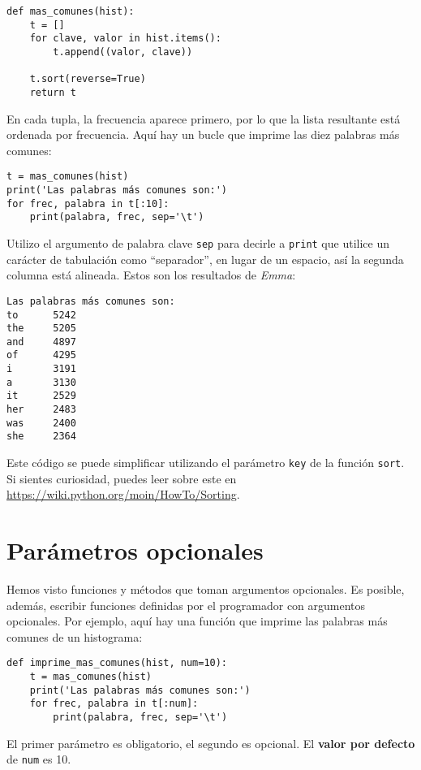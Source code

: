 \documentclass[10pt]{book}
\begin{document}
\begin{verbatim}
def mas_comunes(hist):
    t = []
    for clave, valor in hist.items():
        t.append((valor, clave))

    t.sort(reverse=True)
    return t
\end{verbatim}

En cada tupla, la frecuencia aparece primero, por lo que la lista resultante está
ordenada por frecuencia.  Aquí hay un bucle que imprime las diez palabras más
comunes:

\begin{verbatim}
t = mas_comunes(hist)
print('Las palabras más comunes son:')
for frec, palabra in t[:10]:
    print(palabra, frec, sep='\t')
\end{verbatim}
%
Utilizo el argumento de palabra clave {\tt sep} para decirle a {\tt print} que utilice un
carácter de tabulación como ``separador'', en lugar de un espacio, así la segunda
columna está alineada.  Estos son los resultados de {\em Emma}:

\begin{verbatim}
Las palabras más comunes son:
to      5242
the     5205
and     4897
of      4295
i       3191
a       3130
it      2529
her     2483
was     2400
she     2364
\end{verbatim}
%
Este código se puede simplificar utilizando el parámetro {\tt key} de
la función {\tt sort}.  Si sientes curiosidad, puedes leer sobre este
en \url{https://wiki.python.org/moin/HowTo/Sorting}.


\section{Parámetros opcionales}

Hemos visto funciones y métodos que toman argumentos
opcionales.  Es posible, además, escribir funciones definidas por el programador
con argumentos opcionales.  Por ejemplo, aquí hay una función que
imprime las palabras más comunes de un histograma:

\begin{verbatim}
def imprime_mas_comunes(hist, num=10):
    t = mas_comunes(hist)
    print('Las palabras más comunes son:')
    for frec, palabra in t[:num]:
        print(palabra, frec, sep='\t')
\end{verbatim}

El primer parámetro es obligatorio, el segundo es opcional.
El {\bf valor por defecto} de {\tt num} es 10.
\end{document}
